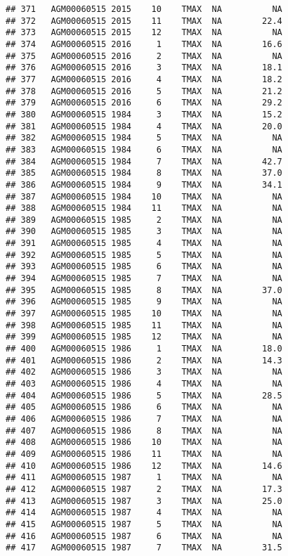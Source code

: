 \documentclass{article}\usepackage[]{graphicx}\usepackage[]{color}
\makeatletter
\newenvironment{kframe}{%
 \def\at@end@of@kframe{}%
 \ifinner\ifhmode%
  \def\at@end@of@kframe{\end{minipage}}%
  \begin{minipage}{\columnwidth}%
 \fi\fi%
 \def\FrameCommand##1{\hskip\@totalleftmargin \hskip-\fboxsep
 \colorbox{shadecolor}{##1}\hskip-\fboxsep
     \hskip-\linewidth \hskip-\@totalleftmargin \hskip\columnwidth}%
 \MakeFramed {\advance\hsize-\width
   \@totalleftmargin\z@ \linewidth\hsize
   \@setminipage}}%
 {\par\unskip\endMakeFramed%
 \at@end@of@kframe}
\newenvironment{knitrout}{}{} %
\makeatother
\begin{document}
\begin{knitrout}
\begin{kframe}
\begin{verbatim}
## 371   AGM00060515 2015    10    TMAX  NA          NA
## 372   AGM00060515 2015    11    TMAX  NA        22.4
## 373   AGM00060515 2015    12    TMAX  NA          NA
## 374   AGM00060515 2016     1    TMAX  NA        16.6
## 375   AGM00060515 2016     2    TMAX  NA          NA
## 376   AGM00060515 2016     3    TMAX  NA        18.1
## 377   AGM00060515 2016     4    TMAX  NA        18.2
## 378   AGM00060515 2016     5    TMAX  NA        21.2
## 379   AGM00060515 2016     6    TMAX  NA        29.2
## 380   AGM00060515 1984     3    TMAX  NA        15.2
## 381   AGM00060515 1984     4    TMAX  NA        20.0
## 382   AGM00060515 1984     5    TMAX  NA          NA
## 383   AGM00060515 1984     6    TMAX  NA          NA
## 384   AGM00060515 1984     7    TMAX  NA        42.7
## 385   AGM00060515 1984     8    TMAX  NA        37.0
## 386   AGM00060515 1984     9    TMAX  NA        34.1
## 387   AGM00060515 1984    10    TMAX  NA          NA
## 388   AGM00060515 1984    11    TMAX  NA          NA
## 389   AGM00060515 1985     2    TMAX  NA          NA
## 390   AGM00060515 1985     3    TMAX  NA          NA
## 391   AGM00060515 1985     4    TMAX  NA          NA
## 392   AGM00060515 1985     5    TMAX  NA          NA
## 393   AGM00060515 1985     6    TMAX  NA          NA
## 394   AGM00060515 1985     7    TMAX  NA          NA
## 395   AGM00060515 1985     8    TMAX  NA        37.0
## 396   AGM00060515 1985     9    TMAX  NA          NA
## 397   AGM00060515 1985    10    TMAX  NA          NA
## 398   AGM00060515 1985    11    TMAX  NA          NA
## 399   AGM00060515 1985    12    TMAX  NA          NA
## 400   AGM00060515 1986     1    TMAX  NA        18.0
## 401   AGM00060515 1986     2    TMAX  NA        14.3
## 402   AGM00060515 1986     3    TMAX  NA          NA
## 403   AGM00060515 1986     4    TMAX  NA          NA
## 404   AGM00060515 1986     5    TMAX  NA        28.5
## 405   AGM00060515 1986     6    TMAX  NA          NA
## 406   AGM00060515 1986     7    TMAX  NA          NA
## 407   AGM00060515 1986     8    TMAX  NA          NA
## 408   AGM00060515 1986    10    TMAX  NA          NA
## 409   AGM00060515 1986    11    TMAX  NA          NA
## 410   AGM00060515 1986    12    TMAX  NA        14.6
## 411   AGM00060515 1987     1    TMAX  NA          NA
## 412   AGM00060515 1987     2    TMAX  NA        17.3
## 413   AGM00060515 1987     3    TMAX  NA        25.0
## 414   AGM00060515 1987     4    TMAX  NA          NA
## 415   AGM00060515 1987     5    TMAX  NA          NA
## 416   AGM00060515 1987     6    TMAX  NA          NA
## 417   AGM00060515 1987     7    TMAX  NA        31.5

\end{verbatim}
\end{kframe}
\end{knitrout}
\end{document}
